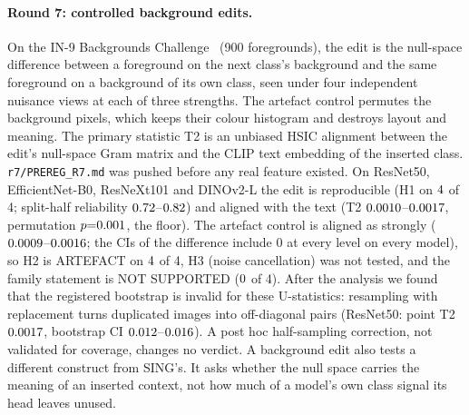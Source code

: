 \documentclass[10pt]{article}
\begin{document}
\paragraph{Round 7: controlled background edits.}
On the IN-9 Backgrounds Challenge~\citep{xiao2021backgrounds} (900 foregrounds), the edit is the null-space difference between a foreground on the next class's background and the same foreground on a background of its own class, seen under four independent nuisance views at each of three strengths. The artefact control permutes the background pixels, which keeps their colour histogram and destroys layout and meaning. The primary statistic T2 is an unbiased HSIC alignment between the edit's null-space Gram matrix and the CLIP text embedding of the inserted class. \texttt{r7/PREREG\_R7.md} was pushed before any real feature existed.
On ResNet50, EfficientNet-B0, ResNeXt101 and DINOv2-L the edit is reproducible (H1 on $4$ of 4; split-half reliability $0.72$--$0.82$) and aligned with the text (T2 $0.0010$--$0.0017$, permutation $p{=}0.001$, the floor). The artefact control is aligned as strongly ($0.0009$--$0.0016$; the CIs of the difference include 0 at every level on every model), so H2 is ARTEFACT on $4$ of 4, H3 (noise cancellation) was not tested, and the family statement is NOT SUPPORTED ($0$ of 4). After the analysis we found that the registered bootstrap is invalid for these U-statistics: resampling with replacement turns duplicated images into off-diagonal pairs (ResNet50: point T2 $0.0017$, bootstrap CI $0.012$--$0.016$). A post hoc half-sampling correction, not validated for coverage, changes no verdict. A background edit also tests a different construct from SING's. It asks whether the null space carries the meaning of an inserted context, not how much of a model's own class signal its head leaves unused.
\end{document}

